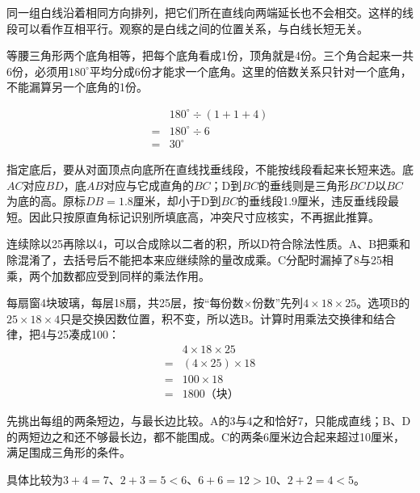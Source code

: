 \documentclass[multi=snippet,border=0pt]{standalone}
\newenvironment{snippet}[3]{\begin{minipage}{#1bp}\color{answerred}\fontsize{#2}{#3}\selectfont\raggedright}{\end{minipage}}
\begin{document}
\begin{snippet}{505}{11.5}{14}同一组白线沿着相同方向排列，把它们所在直线向两端延长也不会相交。这样的线段可以看作互相平行。观察的是白线之间的位置关系，与白线长短无关。\end{snippet}
\begin{snippet}{505}{11.5}{14}等腰三角形两个底角相等，把每个底角看成1份，顶角就是4份。三个角合起来一共6份，必须用\(180^\circ\)平均分成6份才能求一个底角。这里的倍数关系只针对一个底角，不能漏算另一个底角的1份。\par \[\begin{aligned}&180^\circ\div(1+1+4)\\={}&180^\circ\div6\\={}&30^\circ\end{aligned}\]\end{snippet}
\begin{snippet}{505}{11.5}{14}指定底后，要从对面顶点向底所在直线找垂线段，不能按线段看起来长短来选。底\(AC\)对应\(BD\)，底\(AB\)对应与它成直角的\(BC\)；D到\(BC\)的垂线则是三角形\(BCD\)以\(BC\)为底的高。原标\(DB=1.8\)厘米，却小于D到\(BC\)的垂线段1.9厘米，违反垂线段最短。因此只按原直角标记识别所填底高，冲突尺寸应核实，不再据此推算。\end{snippet}
\begin{snippet}{505}{11.5}{14}连续除以25再除以4，可以合成除以二者的积，所以D符合除法性质。A、B把乘和除混淆了，去括号后不能把本来应继续除的量改成乘。C分配时漏掉了8与25相乘，两个加数都应受到同样的乘法作用。\end{snippet}
\begin{snippet}{505}{11.5}{14}每扇窗4块玻璃，每层18扇，共25层，按“每份数\(\times\)份数”先列\(4\times18\times25\)。选项B的\(25\times18\times4\)只是交换因数位置，积不变，所以选B。计算时用乘法交换律和结合律，把4与25凑成100：\[\begin{aligned}&4\times18\times25\\={}&(4\times25)\times18\\={}&100\times18\\={}&1800\text{（块）}\end{aligned}\]\end{snippet}
\begin{snippet}{505}{11.5}{14}先挑出每组的两条短边，与最长边比较。A的3与4之和恰好7，只能成直线；B、D的两短边之和还不够最长边，都不能围成。C的两条6厘米边合起来超过10厘米，满足围成三角形的条件。\par 具体比较为\(3+4=7\)、\(2+3=5<6\)、\(6+6=12>10\)、\(2+2=4<5\)。\end{snippet}
\end{document}

